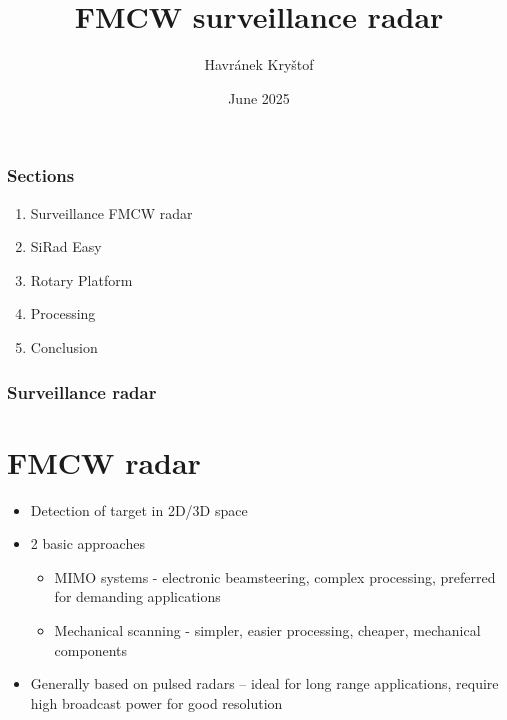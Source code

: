 \documentclass[aspectratio=43]{beamer}
\title{FMCW surveillance radar}
\author{Havránek Kryštof}
\date{June 2025}
\institute{České vysoké učení technické v Praze}
\begin{document}
\begin{frame}[plain]
  \maketitle
\end{frame}

\clearpage
\setcounter{framenumber}{0}

\begin{frame}[fragile]
  \frametitle{Sections}

  \begin{enumerate}
    \item Surveillance FMCW radar
    \item SiRad Easy
    \item Rotary Platform
    \item Processing
    \item Conclusion
  \end{enumerate}
\end{frame}


\begin{frame}[fragile]
  \frametitle{Surveillance radar}
  \section{FMCW radar}

  \begin{itemize}
    \item Detection of target in 2D/3D space
    \item 2 basic approaches
      \begin{itemize}
        \item MIMO systems - electronic beamsteering, complex processing, preferred for demanding applications
        \item Mechanical scanning - simpler, easier processing, cheaper, mechanical components
      \end{itemize}
    \item Generally based on pulsed radars -- ideal for long range applications, require high broadcast power for good resolution
  \end{itemize}
\end{frame}
\end{document}

